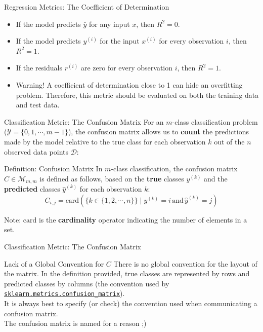 \begin{frame}{Regression Metrics: The Coefficient of Determination}
	\begin{itemize}
		\item If the model predicts $\bar{y}$ for any input $x$, then $R^2 = 0$.
		\pause
		\item If the model predicts $y^{(i)}$ for the input $x^{(i)}$ for every observation $i$, then $R^2 = 1$.
		\pause
		\item If the residuals $r^{(i)}$ are zero for every observation $i$, then $R^2 = 1$.
		\pause
		\item Warning! A coefficient of determination close to 1 can hide an overfitting problem. Therefore, this metric should be evaluated on both the training data and test data.
	\end{itemize}
\end{frame}

\begin{frame}{Classification Metric: The Confusion Matrix}
	For an $m$-class classification problem ($\mathcal{Y} = \{0, 1, \cdots, m-1\}$), the confusion matrix allows us to \textbf{count} the predictions made by the model relative to the true class for each observation $k$ out of the $n$ observed data points $\mathcal{D}$:
	\begin{block}{Definition: Confusion Matrix}
		In $m$-class classification, the confusion matrix $C \in \mathcal{M}_{m,m}$ is defined as follows, based on the \textbf{true} classes $y^{(k)}$ and the \textbf{predicted} classes $\hat{y}^{(k)}$ for each observation $k$:
		\begin{equation}
			C_{i,j} = \text{card} \left( \{k \in \{1, 2, \cdots, n\}\} \mid y^{(k)} = i \, \text{and} \, \hat{y}^{(k)} = j \right)
			\nonumber
		\end{equation}
	\end{block}
	\pause
	Note: $\text{card}$ is the \textbf{cardinality} operator indicating the number of elements in a set.
\end{frame}

\begin{frame}{Classification Metric: The Confusion Matrix}
	\begin{alertblock}{Lack of a Global Convention for $C$}
		There is no global convention for the layout of the matrix. In the definition provided, true classes are represented by rows and predicted classes by columns (the convention used by \href{https://scikit-learn.org/stable/modules/generated/sklearn.metrics.confusion_matrix.html}{\texttt{sklearn.metrics.confusion\_matrix}}). \\
		\vspace{0.5cm}
		It is always best to specify (or check) the convention used when communicating a confusion matrix. \\
		\vspace{0.5cm}
		The confusion matrix is named for a reason ;)
	\end{alertblock}
\end{frame}

